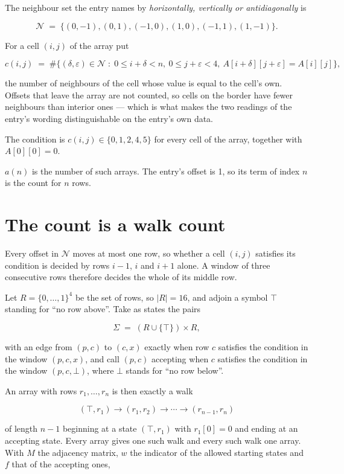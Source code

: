 \documentclass[11pt]{article}
\theoremstyle{definition}
\begin{document}
The neighbour set the entry names by {\itshape horizontally, vertically or antidiagonally} is

\[\mathcal{N} \;=\; \{(0,-1), (0,1), (-1,0), (1,0), (-1,1), (1,-1)\}.\]

For a cell $(i,j)$ of the array put

\[c(i,j) \;=\; \#\bigl\{(\delta,\varepsilon)\in\mathcal{N} \;:\; 0\le i+\delta<n,\ 0\le j+\varepsilon<4,\ A[i+\delta][j+\varepsilon] = A[i][j]\bigr\},\]

the number of neighbours of the cell whose value is equal to the cell's own. Offsets that leave the array are not counted, so cells on the border have fewer neighbours than interior ones --- which is what makes the two readings of the entry's wording distinguishable on the entry's own data.

The condition is $c(i,j) \in \{0, 1, 2, 4, 5\}$ for every cell of the array, together with $A[0][0]=0$.

$a(n)$ is the number of such arrays. The entry's offset is 1, so its term of index $n$ is the count for $n$ rows.

\section{The count is a walk count}

Every offset in $\mathcal{N}$ moves at most one row, so whether a cell $(i,j)$ satisfies its condition is decided by rows $i-1$, $i$ and $i+1$ alone. A window of three consecutive rows therefore decides the whole of its middle row.

Let $R = \{0,\dots,1\}^{4}$ be the set of rows, so $|R| = 16$, and adjoin a symbol $\top$ standing for ``no row above''. Take as states the pairs

\[\Sigma \;=\; (R \cup \{\top\}) \times R,\]

with an edge from $(p,c)$ to $(c,x)$ exactly when row $c$ satisfies the condition in the window $(p,c,x)$, and call $(p,c)$ accepting when $c$ satisfies the condition in the window $(p,c,\bot)$, where $\bot$ stands for ``no row below''.

An array with rows $r_1,\dots,r_n$ is then exactly a walk

\[(\top,r_1) \to (r_1,r_2) \to \cdots \to (r_{n-1},r_n)\]

of length $n-1$ beginning at a state $(\top,r_1)$ with $r_1[0]=0$ and ending at an accepting state. Every array gives one such walk and every such walk one array. With $M$ the adjacency matrix, $w$ the indicator of the allowed starting states and $f$ that of the accepting ones,
\end{document}
